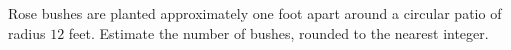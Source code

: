 Rose bushes are planted approximately one foot apart around a circular patio of radius $12$ feet. Estimate the number of bushes, rounded to the nearest integer.

